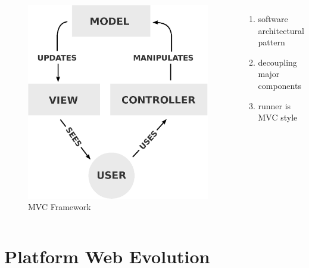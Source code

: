 \documentclass{beamer}
\begin{document}
\begin{frame}
  \begin{columns}[c] %

    \begin{figure}
      \centering
      \includegraphics[width=0.75\linewidth]{mvc_process}
      \caption{MVC Framework}
    \end{figure}

    \begin{enumerate}
    \item software architectural pattern
    \item decoupling major components
    \item runner is MVC style
    \end{enumerate}

  \end{columns}
\end{frame}

\section{Platform Web Evolution} %
\end{document}
